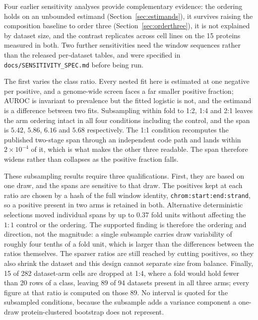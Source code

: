 Four earlier sensitivity analyses provide complementary evidence: the ordering holds on an unbounded
estimand (Section~\ref{sec:estimands}), it survives raising the composition baseline to order three
(Section~\ref{sec:orderthree}), it is not explained by dataset size, and the contrast replicates
across cell lines on the 15 proteins measured in both. Two further sensitivities need the window sequences
rather than the released per-dataset tables, and were specified in
\texttt{docs/SENSITIVITY\_SPEC.md} before being run.

The first varies the class ratio. Every nested fit here is estimated at one negative per
positive, and a genome-wide screen faces a far smaller positive fraction; AUROC is invariant to
prevalence but the fitted logistic is not, and the estimand is a difference between two fits.
Subsampling within fold to 1:2, 1:4 and 2:1 leaves the arm ordering intact in all four
conditions including the control, and the span is $5.42$, $5.86$, $6.16$ and $5.68$
respectively. The 1:1 condition recomputes the published two-stage span through an independent
code path and lands within $2\times10^{-4}$ of it, which is what makes the other three readable.
The span therefore widens rather than collapses as the positive fraction falls.

These subsampling results require three qualifications. First, they are based on one draw, and
the spans are sensitive to that draw. The positives kept at each ratio are chosen by a hash of
the full window identity, \texttt{chrom:start:end:strand}, so a positive present in two arms is
retained in both. Alternative deterministic selections moved individual spans by up to $0.37$
fold units without affecting the $1{:}1$ control or the ordering. The supported finding is
therefore the ordering and direction, not the magnitude: a single subsample carries draw variability of roughly four
tenths of a fold unit, which is larger than the differences between the ratios themselves. The sparser ratios are still reached by cutting positives, so they also
shrink the dataset and this design cannot separate size from balance. Finally, 15 of 282 dataset-arm
cells are dropped at 1:4, where a fold would hold fewer than 20 rows of a class, leaving 89 of
94 datasets present in all three arms; every figure at that ratio is computed on those 89. No
interval is quoted for the subsampled conditions, because the subsample adds a variance
component a one-draw protein-clustered bootstrap does not represent.

